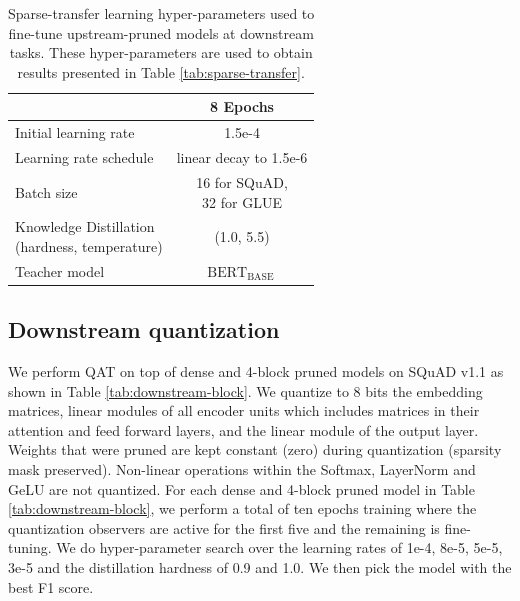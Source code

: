 \documentclass[11pt]{article}
\newcommand{\greyrule}{\arrayrulecolor{black!30}\midrule\arrayrulecolor{black}}
\newcommand{\bert}{$\textrm{BERT}_{\textrm{BASE}}\,$}
\begin{document}
\begin{table}
      \centering
        {\small 
            \begin{tabular}{l|c}
            \toprule
            & 8 Epochs \\
            \midrule
            Initial learning rate & 1.5e-4 \\
            Learning rate schedule & linear decay to 1.5e-6 \\
            \greyrule
            Batch size & \makecell{16 for SQuAD,\\ 32 for GLUE} \\
            \greyrule
            \makecell{Knowledge Distillation\\(hardness, temperature)} & (1.0, 5.5) \\
            \greyrule
            Teacher model & \bert \\
            \bottomrule
            \end{tabular}
        }
        \caption{Sparse-transfer learning hyper-parameters used to fine-tune upstream-pruned models at downstream tasks. These hyper-parameters are used to obtain results presented in Table \ref{tab:sparse-transfer}.}
    \label{tab:hyperparams-transfer}
\end{table}

\subsection{Downstream quantization}
\label{app:hyperparams-DownstreamQuantization}

We perform QAT on top of dense and 4-block pruned models on SQuAD v1.1 as shown in Table \ref{tab:downstream-block}. We quantize to 8 bits the embedding matrices, linear modules of all encoder units which includes matrices in their attention and feed forward layers, and the linear module of the output layer. Weights that were pruned are kept constant (zero) during quantization (sparsity mask preserved). Non-linear operations within the Softmax, LayerNorm and GeLU are not quantized. For each dense and 4-block pruned model in Table \ref{tab:downstream-block}, we perform a total of ten epochs training where the quantization observers are active for the first five and the remaining is fine-tuning. We do hyper-parameter search over the learning rates of 1e-4, 8e-5, 5e-5, 3e-5 and the distillation hardness of 0.9 and 1.0. We then pick the model with the best F1 score.
\end{document}
